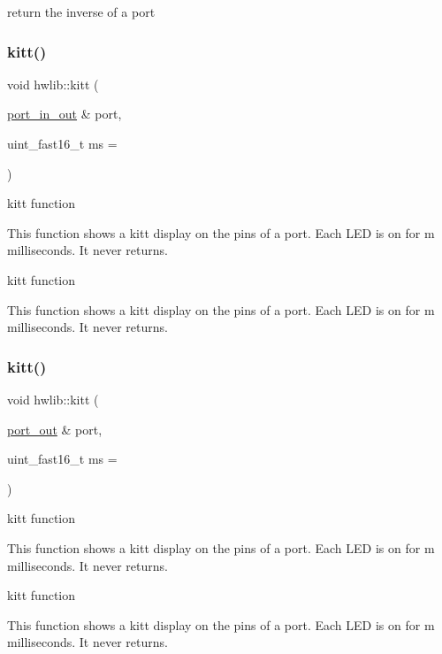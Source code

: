 return the inverse of a port \mbox{\label{namespacehwlib_aaabcbce6ceaee099d8b63d7ced145cea}} 
\subsubsection{\texorpdfstring{kitt()}{kitt()}\hspace{0.1cm}{\footnotesize\ttfamily [1/3]}}
{\footnotesize\ttfamily void hwlib\+::kitt (\begin{DoxyParamCaption}\item[{\hyperlink{classhwlib_1_1port__in__out}{port\+\_\+in\+\_\+out} \&}]{port,  }\item[{uint\+\_\+fast16\+\_\+t}]{ms = {} }\end{DoxyParamCaption})}



kitt function 

This function shows a kitt display on the pins of a port. Each L\+ED is on for m milliseconds. It never returns.

kitt function

This function shows a kitt display on the pins of a port. Each L\+ED is on for m milliseconds. It never returns. \mbox{\label{namespacehwlib_a0e6f0ad32ff93519562a880047f3fc2e}} 
\subsubsection{\texorpdfstring{kitt()}{kitt()}\hspace{0.1cm}{\footnotesize\ttfamily [2/3]}}
{\footnotesize\ttfamily void hwlib\+::kitt (\begin{DoxyParamCaption}\item[{\hyperlink{classhwlib_1_1port__out}{port\+\_\+out} \&}]{port,  }\item[{uint\+\_\+fast16\+\_\+t}]{ms = {} }\end{DoxyParamCaption})}



kitt function 

This function shows a kitt display on the pins of a port. Each L\+ED is on for m milliseconds. It never returns.

kitt function

This function shows a kitt display on the pins of a port. Each L\+ED is on for m milliseconds. It never returns. \mbox{\label{namespacehwlib_a2f86682625c78a7c595bac456ed81b5c}} 
